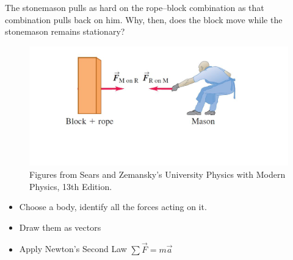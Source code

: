 \documentclass[]{beamer}
\begin{document}

 

    \begin{frame}
      The stonemason pulls as hard on the rope–block combination as that combination pulls
      back on him. Why, then, does the block move while the stonemason  remains stationary?
      
      \vspace{5mm}
    

      \begin{figure}[h!]  
        \includegraphics[width=1.\textwidth]{images/f15.jpg}
        \caption{ {\tiny Figures from Sears and Zemansky's University Physics 
        with Modern Physics, 13th Edition.} }
      \end{figure}

      \end{frame}





    \begin{frame}
      \begin{itemize}
        \item Choose a body, identify all the forces acting on it. 
        \item Draw them as vectors
        \item Apply Newton's Second Law $\sum \vec{F}=m\vec{a}$
      \end{itemize}
      \end{frame}


\end{document}
